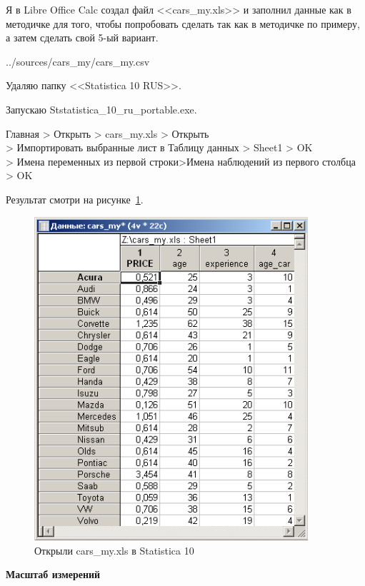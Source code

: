 Я в Libre Office Calc \cite{downloadLibreOffice} создал файл
<<cars\_my.xls>> и заполнил данные как в методичке для того, чтобы попробовать сделать так как в методичке по примеру, а затем сделать свой 5-ый вариант.


{../sources/cars_my/cars_my.csv}

Удаляю папку <<Statistica 10 RUS>>.

Запускаю Ststatistica\_10\_ru\_portable.exe.

Главная > Открыть > cars\_my.xls > Открыть \\
> Импортировать выбранные лист в Таблицу данных > Sheet1 > OK \\
> Имена переменных из первой строки>Имена наблюдений из первого столбца > OK

Результат смотри на рисунке~\ref{fig:1_1}.

\begin{figure}[!h]
  \centering

  \includegraphics[height=12cm]
  {inc/cars_my/1.1.PNG}

  \caption{Открыли cars\_my.xls в Statistica 10}

  \label{fig:1_1}
\end{figure}

\begin{center}
  \textbf{Масштаб измерений}
\end{center}

